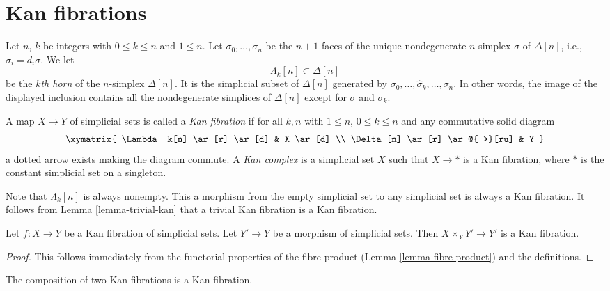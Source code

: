 \section{Kan fibrations}
\label{section-kan}

\noindent
Let $n$, $k$ be integers with $0 \leq k \leq n$ and $1 \leq n$.
Let $\sigma_0, \ldots, \sigma_n$
be the $n + 1$ faces of the unique nondegenerate $n$-simplex $\sigma$
of $\Delta[n]$, i.e., $\sigma_i = d_i\sigma$. We let
$$
\Lambda_k[n] \subset \Delta[n]
$$
be the {\it $k$th horn} of the $n$-simplex $\Delta[n]$. It is the
simplicial subset of $\Delta[n]$ generated by
$\sigma_0, \ldots, \hat \sigma_k, \ldots, \sigma_n$. In other words,
the image of the displayed inclusion contains all the nondegenerate
simplices of $\Delta[n]$ except for $\sigma$ and $\sigma_k$.

\begin{definition}
\label{definition-kan}
A map $X \to Y$ of simplicial sets is called a {\it Kan fibration}
if for all $k, n$ with $1 \leq n$, $0 \leq k \leq n$ and any commutative
solid diagram
$$
\xymatrix{
\Lambda_k[n] \ar[r] \ar[d] & X \ar[d] \\
\Delta[n] \ar[r] \ar@{-->}[ru] & Y
}
$$
a dotted arrow exists making the diagram commute. A {\it Kan complex}
is a simplicial set $X$ such that $X \to *$ is a Kan fibration, where
$*$ is the constant simplicial set on a singleton.
\end{definition}

\noindent
Note that $\Lambda_k[n]$ is always nonempty. This a morphism from the empty
simplicial set to any simplicial set is always a Kan fibration. It follows
from Lemma \ref{lemma-trivial-kan} that a trivial Kan fibration is a
Kan fibration.

\begin{lemma}
\label{lemma-kan-base-change}
Let $f : X \to Y$ be a Kan fibration of simplicial sets.
Let $Y' \to Y$ be a morphism of simplicial sets.
Then $X \times_Y Y' \to Y'$ is a Kan fibration.
\end{lemma}

\begin{proof}
This follows immediately from the functorial properties of the fibre
product (Lemma \ref{lemma-fibre-product}) and the definitions.
\end{proof}

\begin{lemma}
\label{lemma-kan-composition}
The composition of two Kan fibrations is a Kan fibration.
\end{lemma}


